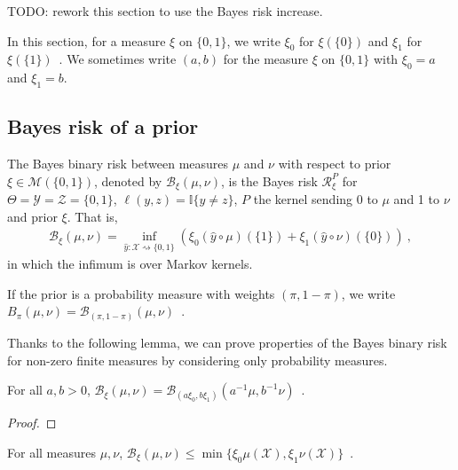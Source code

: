 TODO: rework this section to use the Bayes risk increase.

In this section, for a measure $\xi$ on $\{0,1\}$, we write $\xi_0$ for $\xi(\{0\})$ and $\xi_1$ for $\xi(\{1\})$~. We sometimes write $(a,b)$ for the measure $\xi$ on $\{0,1\}$ with $\xi_0 = a$ and $\xi_1 = b$.

\subsection{Bayes risk of a prior}

\begin{definition}
  \label{def:bayesBinaryRisk}
  \leanok
  The Bayes binary risk between measures $\mu$ and $\nu$ with respect to prior $\xi \in \mathcal M(\{0,1\})$, denoted by $\mathcal B_\xi(\mu, \nu)$, is the Bayes risk $\mathcal R^P_\xi$ for $\Theta = \mathcal Y = \mathcal Z = \{0,1\}$, $\ell(y,z) = \mathbb{I}\{y \ne z\}$, $P$ the kernel sending 0 to $\mu$ and 1 to $\nu$ and prior $\xi$.
  That is,
  \begin{align*}
  \mathcal B_\xi(\mu, \nu) = \inf_{\hat{y} : \mathcal X \rightsquigarrow \{0,1\}}\left(\xi_0 (\hat{y} \circ \mu)(\{1\}) + \xi_1 (\hat{y} \circ \nu)(\{0\})\right)
  \: ,
  \end{align*}
  in which the infimum is over Markov kernels.

  If the prior is a probability measure with weights $(\pi, 1 - \pi)$, we write $B_\pi(\mu, \nu) = \mathcal B_{(\pi, 1 - \pi)}(\mu, \nu)$~.
\end{definition}

Thanks to the following lemma, we can prove properties of the Bayes binary risk for non-zero finite measures by considering only probability measures.

\begin{lemma}
  \label{lem:bayesBinaryRisk_mul}
  For all $a, b > 0$, $\mathcal B_\xi(\mu, \nu) = \mathcal B_{(a \xi_0, b \xi_1)}(a^{-1} \mu, b^{-1} \nu)$~.
\end{lemma}

\begin{proof}%
\uses{}

\end{proof}

\begin{lemma}
  \label{lem:bayesBinaryRisk_le}
  \leanok
  For all measures $\mu, \nu$, $\mathcal B_\xi(\mu, \nu) \le \min\{\xi_0 \mu(\mathcal X), \xi_1 \nu(\mathcal X)\}$~.
\end{lemma}

